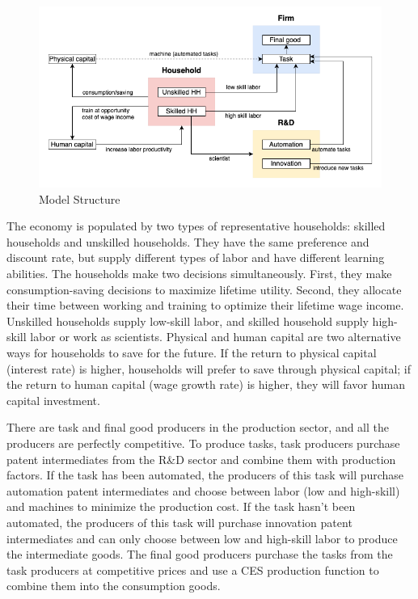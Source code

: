 \documentclass[12pt]{article}
\begin{document}
\begin{figure}[h!]
\includegraphics[width = \textwidth]{Model}
\caption{Model Structure}
\label{model}
\end{figure}

The economy is populated by two types of representative households: skilled households and unskilled households. They have the same preference and discount rate, but supply different types of labor and have different learning abilities. The households make two decisions simultaneously. First, they make consumption-saving decisions to maximize lifetime utility. Second, they allocate their time between working and training to optimize their lifetime wage income. Unskilled households supply low-skill labor, and skilled household supply high-skill labor or work as scientists. Physical and human capital are two alternative ways for households to save for the future. If the return to physical capital (interest rate) is higher, households will prefer to save through physical capital; if the return to human capital (wage growth rate) is higher, they will favor human capital investment. 

There are task and final good producers in the production sector, and all the producers are perfectly competitive. To produce tasks, task producers purchase patent intermediates from the R\&D sector and combine them with production factors. If the task has been automated, the producers of this task will purchase automation patent intermediates and choose between labor (low and high-skill) and machines to minimize the production cost. If the task hasn't been automated, the producers of this task will purchase innovation patent intermediates and can only choose between low and high-skill labor to produce the intermediate goods. The final good producers purchase the tasks from the task producers at competitive prices and use a CES production function to combine them into the consumption goods. 
\end{document}
